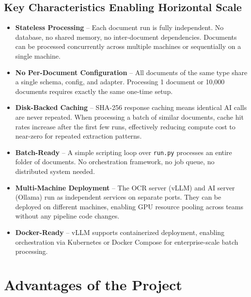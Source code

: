 \documentclass[12pt,a4paper]{report}
\begin{document}
\section{Key Characteristics Enabling Horizontal Scale}

\begin{itemize}[nosep]
    \item \textbf{Stateless Processing} -- Each document run is fully independent. No database, no shared memory, no inter-document dependencies. Documents can be processed concurrently across multiple machines or sequentially on a single machine.
    \item \textbf{No Per-Document Configuration} -- All documents of the same type share a single schema, config, and adapter. Processing 1 document or 10{,}000 documents requires exactly the same one-time setup.
    \item \textbf{Disk-Backed Caching} -- SHA-256 response caching means identical AI calls are never repeated. When processing a batch of similar documents, cache hit rates increase after the first few runs, effectively reducing compute cost to near-zero for repeated extraction patterns.
    \item \textbf{Batch-Ready} -- A simple scripting loop over \texttt{run.py} processes an entire folder of documents. No orchestration framework, no job queue, no distributed system needed.
    \item \textbf{Multi-Machine Deployment} -- The OCR server (vLLM) and AI server (Ollama) run as independent services on separate ports. They can be deployed on different machines, enabling GPU resource pooling across teams without any pipeline code changes.
    \item \textbf{Docker-Ready} -- vLLM supports containerized deployment, enabling orchestration via Kubernetes or Docker Compose for enterprise-scale batch processing.
\end{itemize}

\chapter{Advantages of the Project}
\end{document}
